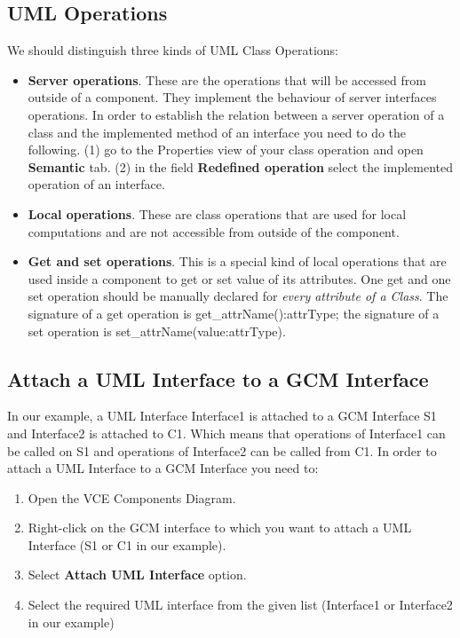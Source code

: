\documentclass[12pt]{article}
\begin{document}
\subsection{UML Operations}
We should distinguish three kinds of UML Class Operations:
\begin{itemize}
\item
\textbf{Server operations}. These are the operations that will be accessed from outside of a component. They implement the behaviour of server interfaces operations. In order to establish the relation between a server operation of a class and the implemented method of an interface you need to do the following. (1) go to the Properties view of your class operation and open \textbf{Semantic} tab. (2) in the field \textbf{Redefined operation} select the implemented operation of an interface.
\item
\textbf{Local operations}. These are class operations that are used for local computations and are not accessible from outside of the component.
\item
\textbf{Get and set operations}. This is a special kind of local operations that are used inside a component to get or set value of its attributes. One get and one set operation should be manually declared for \textit{every attribute of a Class}. The signature of a get operation is \textsf{get\_attrName():attrType}; the signature of a set operation is \textsf{set\_attrName(value:attrType)}.
\end{itemize}

\subsection{Attach a UML Interface to a GCM Interface}
In our example, a UML Interface Interface1 is attached to a GCM Interface S1 and Interface2 is attached to C1. Which means that operations of Interface1 can be called on S1 and operations of Interface2 can be called from C1. In order to attach a UML Interface to a GCM Interface you need to:
\begin{enumerate}
\item
Open the VCE Components Diagram.
\item
Right-click on the GCM interface to which you want to attach a UML Interface (S1 or C1 in our example).
\item
Select \textbf{Attach UML Interface} option.
\item
Select the required UML interface from the given list (Interface1 or Interface2 in our example)
\end{enumerate}
\end{document}
